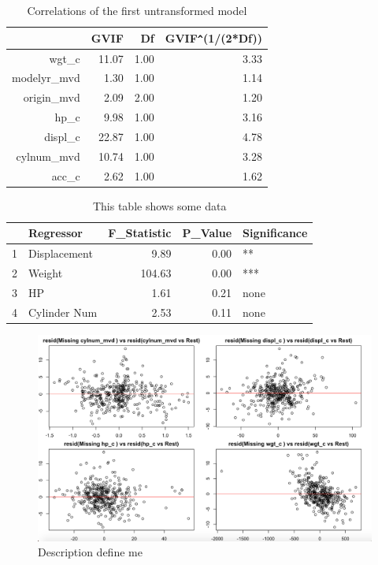 \documentclass{article}
\begin{document}
\clearpage
\newpage 

\begin{table}[ht]
\centering
\begin{tabular}{rrrr}
  \hline
 & GVIF & Df & GVIF\verb|^|(1/(2*Df)) \\ 
  \hline
wgt\_c & 11.07 & 1.00 & 3.33 \\ 
  modelyr\_mvd & 1.30 & 1.00 & 1.14 \\ 
  origin\_mvd & 2.09 & 2.00 & 1.20 \\ 
  hp\_c & 9.98 & 1.00 & 3.16 \\ 
  displ\_c & 22.87 & 1.00 & 4.78 \\ 
  cylnum\_mvd & 10.74 & 1.00 & 3.28 \\ 
  acc\_c & 2.62 & 1.00 & 1.62 \\ 
   \hline
\end{tabular}
\caption{Correlations of the first untransformed model}
\label{tab:myfirsttable}
\end{table}

\begin{table}[ht]
\centering
\begin{tabular}{rlrrl}
  \hline
 & Regressor & F\_Statistic & P\_Value & Significance \\ 
  \hline
1 & Displacement & 9.89 & 0.00 & ** \\ 
  2 & Weight & 104.63 & 0.00 & *** \\ 
  3 & HP & 1.61 & 0.21 & none \\ 
  4 & Cylinder Num & 2.53 & 0.11 & none \\ 
   \hline
\end{tabular}
\caption{This table shows some data}
\label{tab:myfirsttable}
\end{table}

\clearpage
\newpage 

\begin{figure}
	\centering
	\includegraphics[width=1\linewidth]{11-14p_PrRgall4}
	\caption[TOC Define Me]
	{Description define me}
\end{figure}
\end{document}
